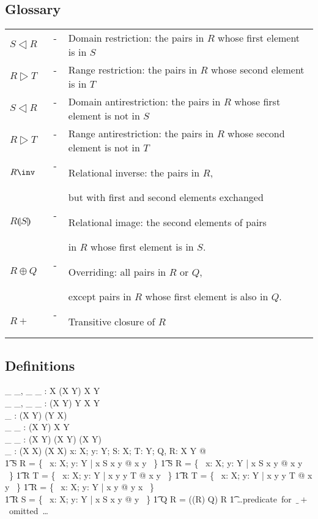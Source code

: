 \documentclass{article}
\begin{document}
\subsection*{Glossary}

\begin{tabular}{l c l}
$S \dres R$ & ~-~ & Domain restriction: the pairs in $R$ whose first element is in $S$ \\
$R \rres T$ & ~-~ & Range restriction: the pairs in $R$ whose second element is in $T$ \\
$S \dres R$ & ~-~ & Domain antirestriction: the pairs in $R$ whose first element is not in $S$ \\
$R \rres T$ & ~-~ & Range antirestriction: the pairs in $R$ whose second element is not in $T$ \\
$R \inv$ & ~-~ & Relational inverse: the  pairs in $R$, \\
	&  & but with first and second elements exchanged \\
$R \limg S \rimg$ & ~-~ & Relational image: the second elements of pairs \\
		&  & in $R$ whose first element is in $S$. \\
$R \oplus Q$ & ~-~ & Overriding: all pairs in $R$ or $Q$, \\
	& & except pairs in $R$ whose first element is also in $Q$. \\
$R \plus$ & ~-~ & Transitive closure of $R$ \\
\end{tabular}

\subsection*{Definitions}

\begin{gendef}[X,Y]
	\_ \dres \_, \_ \ndres \_ : \power X \cross (X \rel Y) \fun X \rel Y \\
	\_ \rres \_, \_ \nrres \_ : (X \rel Y)  \cross  \power Y \fun X \rel Y \\
	\_ \inv : (X \rel Y) \fun (Y \rel X) \\
	\_ \limg \_ \rimg : (X \rel Y) \cross \power X \fun \power Y \\
	\_ \oplus \_ : (X \rel Y) \cross (X \rel Y) \fun (X \rel Y) \\
	\_ \plus : (X \rel X) \fun (X \rel X)
\where
	\forall x: X; y: Y; S: \power X; T: \power Y; Q, R: X \rel Y @ \\
\also
\t1 S \dres R = \{~ x: X; y: Y | x \in S \land x  y @ x \mapsto y ~\} \land	
\also
\t1 S \ndres R = \{~ x: X; y: Y | x \notin S \land x  y @ x \mapsto y ~\} \land	
\also
\t1 R \rres T = \{~ x: X; y: Y | x  y \land y \in T @ x \mapsto y ~\} \land	
\also
\t1 R \nrres T = \{~ x: X; y: Y | x  y \land y \notin T @ x \mapsto y ~\} \land	
\also	
\t1	R \inv = \{~ x: X; y: Y | x  y @ y \mapsto x ~\} \land \\
\also 
\t1 R \limg S \rimg = \{~ x: X; y: Y | x \in S \land x  y @ y ~\} \land	
\also
\t1	Q \oplus R = ((\dom R) \ndres Q) \cup R
\also
\t1	\mbox{\dots predicate for $\_ \plus$ omitted \dots}
\also
\end{gendef}
\end{document}
